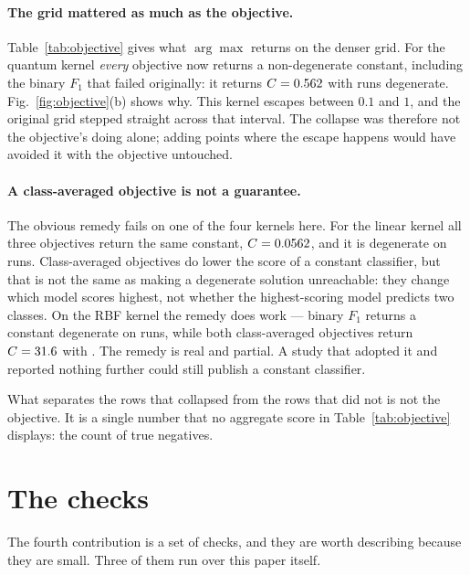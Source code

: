 \documentclass[runningheads]{llncs}
\newcommand{\Fone}{F_1}
\begin{document}
\paragraph{The grid mattered as much as the objective.}

Table~\ref{tab:objective} gives what $\arg\max$ returns on the denser grid.
For the quantum kernel \emph{every} objective now returns a non-degenerate
constant, including the binary $\Fone$ that failed originally: it returns
$C = 0.562$ with \pobjQBinDeg{} runs degenerate.
Fig.~\ref{fig:objective}(b) shows why. This kernel escapes between $0.1$ and
$1$, and the original grid stepped straight across that interval. The
collapse was therefore not the objective's doing alone; adding points where
the escape happens would have avoided it with the objective untouched.

\paragraph{A class-averaged objective is not a guarantee.}
The obvious remedy fails on one of the four kernels here. For the linear
kernel all three objectives return the same constant, $C = 0.0562$,
and it is degenerate on \pobjLinMacDeg{} runs. Class-averaged objectives do
lower the score of a constant classifier, but that is not the same as making
a degenerate solution unreachable: they change which model scores highest,
not whether the highest-scoring model predicts two classes. On the RBF
kernel the remedy does work --- binary $\Fone$ returns a constant degenerate
on \pobjRbfBinDeg{} runs, while both class-averaged objectives return
$C = 31.6{}$ with \pobjRbfMacDeg. The remedy is real and partial. A
study that adopted it and reported nothing further could still publish a
constant classifier.

What separates the rows that collapsed from the rows that did not is not the
objective. It is a single number that no aggregate score in
Table~\ref{tab:objective} displays: the count of true negatives.

\section{The checks}\label{sec:checks}

The fourth contribution is a set of checks, and they are worth describing
because they are small. Three of them run over this paper itself.
\end{document}
